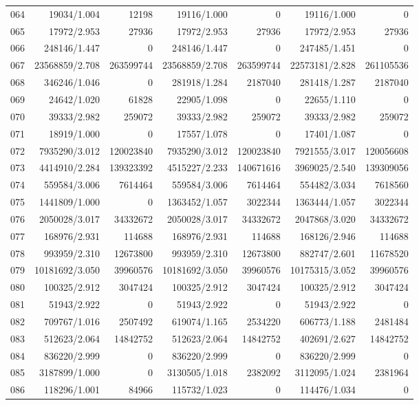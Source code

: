 \begin{longtable}{crrrrrr}
064 & 19034/1.004 & 12198 & 19116/1.000 & 0 & 19116/1.000 & 0 \\
065 & 17972/2.953 & 27936 & 17972/2.953 & 27936 & 17972/2.953 & 27936 \\
066 & 248146/1.447 & 0 & 248146/1.447 & 0 & 247485/1.451 & 0 \\
067 & 23568859/2.708 & 263599744 & 23568859/2.708 & 263599744 & 22573181/2.828 & 261105536 \\
068 & 346246/1.046 & 0 & 281918/1.284 & 2187040 & 281418/1.287 & 2187040 \\
069 & 24642/1.020 & 61828 & 22905/1.098 & 0 & 22655/1.110 & 0 \\
070 & 39333/2.982 & 259072 & 39333/2.982 & 259072 & 39333/2.982 & 259072 \\
071 & 18919/1.000 & 0 & 17557/1.078 & 0 & 17401/1.087 & 0 \\
072 & 7935290/3.012 & 120023840 & 7935290/3.012 & 120023840 & 7921555/3.017 & 120056608 \\
073 & 4414910/2.284 & 139323392 & 4515227/2.233 & 140671616 & 3969025/2.540 & 139309056 \\
074 & 559584/3.006 & 7614464 & 559584/3.006 & 7614464 & 554482/3.034 & 7618560 \\
075 & 1441809/1.000 & 0 & 1363452/1.057 & 3022344 & 1363444/1.057 & 3022344 \\
076 & 2050028/3.017 & 34332672 & 2050028/3.017 & 34332672 & 2047868/3.020 & 34332672 \\
077 & 168976/2.931 & 114688 & 168976/2.931 & 114688 & 168126/2.946 & 114688 \\
078 & 993959/2.310 & 12673800 & 993959/2.310 & 12673800 & 882747/2.601 & 11678520 \\
079 & 10181692/3.050 & 39960576 & 10181692/3.050 & 39960576 & 10175315/3.052 & 39960576 \\
080 & 100325/2.912 & 3047424 & 100325/2.912 & 3047424 & 100325/2.912 & 3047424 \\
081 & 51943/2.922 & 0 & 51943/2.922 & 0 & 51943/2.922 & 0 \\
082 & 709767/1.016 & 2507492 & 619074/1.165 & 2534220 & 606773/1.188 & 2481484 \\
083 & 512623/2.064 & 14842752 & 512623/2.064 & 14842752 & 402691/2.627 & 14842752 \\
084 & 836220/2.999 & 0 & 836220/2.999 & 0 & 836220/2.999 & 0 \\
085 & 3187899/1.000 & 0 & 3130505/1.018 & 2382092 & 3112095/1.024 & 2381964 \\
086 & 118296/1.001 & 84966 & 115732/1.023 & 0 & 114476/1.034 & 0 \\

\end{longtable}
